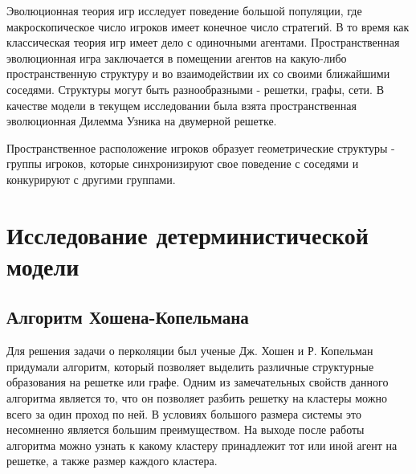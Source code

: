 \documentclass[12pt,a4paper]{article}
\begin{document}
	\par Эволюционная теория игр исследует поведение большой популяции, где макроскопическое
	число игроков имеет конечное число стратегий. В то время как классическая теория игр имеет дело с одиночными агентами. Пространственная эволюционная игра заключается в помещении агентов на какую-либо пространственную структуру и во взаимодействии их со своими ближайшими соседями. Структуры могут быть разнообразными - решетки, графы, сети. В качестве модели в текущем исследовании была взята пространственная эволюционная Дилемма Узника на двумерной решетке.
	
	\par Пространственное расположение игроков образует геометрические структуры - группы игроков, которые синхронизируют свое поведение с соседями и конкурируют с другими группами.
	 
	\section{Исследование детерминистической модели}
	
	\subsection{Алгоритм Хошена-Копельмана}
	
	\par Для решения задачи о перколяции был ученые Дж. Хошен и Р. Копельман придумали алгоритм, который позволяет выделить различные структурные образования на решетке или графе\cite{hk76}. Одним из замечательных свойств данного алгоритма является то, что он позволяет разбить решетку на кластеры можно всего за один проход по ней. В условиях большого размера системы это несомненно является большим преимуществом. На выходе после работы алгоритма можно узнать к какому кластеру принадлежит тот или иной агент на решетке, а также размер каждого кластера.
	
\end{document}
